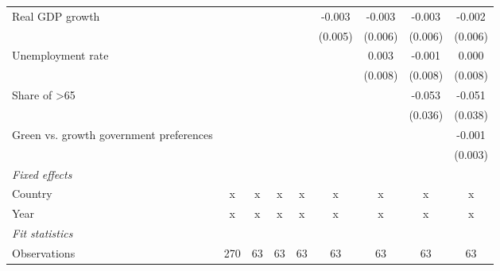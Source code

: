 \begin{table}[htbp]
\begin{tabular}{lcccccccc}
      Real GDP growth                                                          &         &         &               &                & -0.003         & -0.003         & -0.003         & -0.002\\   
                                                                               &         &         &               &                & (0.005)        & (0.006)        & (0.006)        & (0.006)\\   
      Unemployment rate                                                        &         &         &               &                &                & 0.003          & -0.001         & 0.000\\   
                                                                               &         &         &               &                &                & (0.008)        & (0.008)        & (0.008)\\   
      Share of >65                                                             &         &         &               &                &                &                & -0.053         & -0.051\\   
                                                                               &         &         &               &                &                &                & (0.036)        & (0.038)\\   
      Green vs. growth government preferences                                  &         &         &               &                &                &                &                & -0.001\\   
                                                                               &         &         &               &                &                &                &                & (0.003)\\   
      \emph{Fixed effects}\\
      Country                                                                  & x       & x       & x             & x              & x              & x              & x              & x\\  
      Year                                                                     & x       & x       & x             & x              & x              & x              & x              & x\\  
      \midrule \emph{Fit statistics}\\
      Observations                                                             & 270     & 63      & 63            & 63             & 63             & 63             & 63             & 63\\  

\end{tabular}
\end{table}
